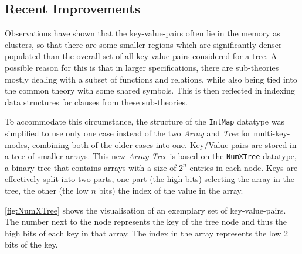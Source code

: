 \documentclass[]{ceurart}
\begin{document}
\subsection{Recent Improvements}

Observations have shown that the key-value-pairs often lie in the
memory as clusters, so that there are some smaller regions which are
significantly denser populated than the overall set of all
key-value-pairs considered for a tree. A possible reason for this is
that in larger specifications, there are sub-theories mostly dealing
with a subset of functions and relations, while also being tied into
the common theory with some shared symbols. This is then reflected in
indexing data structures for clauses from these sub-theories.

To accommodate this circumstance, the structure of the \texttt{IntMap}
datatype was simplified to use only one case instead of the two
\emph{Array} and \emph{Tree} for multi-key-modes, combining both of
the older cases into one. Key/Value pairs are stored in a tree of
smaller arrays. This new \emph{Array-Tree} is based on the
\texttt{NumXTree} datatype, a binary tree that contains arrays with a
size of $2^n$ entries in each node. Keys are effectively split into
two parts, one part (the high bits) selecting the array in the tree,
the other (the low $n$ bits) the index of the value in the array.

\autoref{fig:NumXTree} shows the visualisation of an exemplary set of
key-value-pairs.  The number next to the node represents the key of
the tree node and thus the high bits of each key in that array. The
index in the array represents the low 2 bits of the key.
\end{document}
